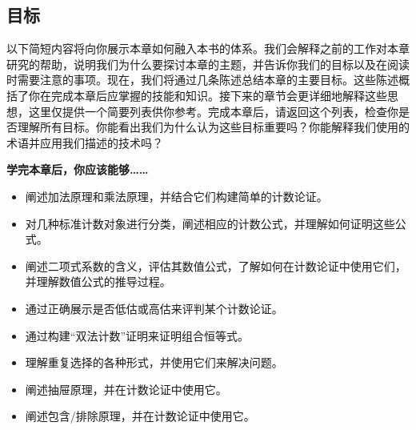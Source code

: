 
\subsection{目标}

以下简短内容将向你展示本章如何融入本书的体系。我们会解释之前的工作对本章研究的帮助，说明我们为什么要探讨本章的主题，并告诉你我们的目标以及在阅读时需要注意的事项。现在，我们将通过几条陈述总结本章的主要目标。这些陈述概括了你在完成本章后应掌握的技能和知识。接下来的章节会更详细地解释这些思想，这里仅提供一个简要列表供你参考。完成本章后，请返回这个列表，检查你是否理解所有目标。你能看出我们为什么认为这些目标重要吗？你能解释我们使用的术语并应用我们描述的技术吗？

\textbf{学完本章后，你应该能够……}

\begin{itemize}
    \item 阐述加法原理和乘法原理，并结合它们构建简单的计数论证。
    \item 对几种标准计数对象进行分类，阐述相应的计数公式，并理解如何证明这些公式。
    \item 阐述二项式系数的含义，评估其数值公式，了解如何在计数论证中使用它们，并理解数值公式的推导过程。
    \item 通过正确展示是否低估或高估来评判某个计数论证。
    \item 通过构建``双法计数''证明来证明组合恒等式。
    \item 理解重复选择的各种形式，并使用它们来解决问题。
    \item 阐述抽屉原理，并在计数论证中使用它。
    \item 阐述包含/排除原理，并在计数论证中使用它。
\end{itemize}